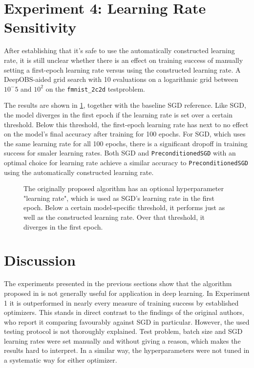 \documentclass[twoside,12pt,a4paper]{report}
\begin{document}
\section{Experiment 4: Learning Rate Sensitivity}

After establishing that it's safe to use the automatically constructed learning rate, it is still unclear whether there is an effect on training success of manually setting a first-epoch learning rate versus using the constructed learning rate.
A DeepOBS-aided grid search with 10 evaluations on a logarithmic grid between $10^-5$ and $10^2$ on the \verb|fmnist_2c2d| testproblem.

The results are shown in \ref{fig:exp_lr_sens}, together with the baseline SGD reference.
Like SGD, the model diverges in the first epoch if the learning rate is set over a certain threshold. Below this threshold, the first-epoch learning rate has next to no effect on the model's final accuracy after training for 100 epochs. For SGD, which uses the same learning rate for all 100 epochs, there is a significant dropoff in training success for smaler learning rates.
Both SGD and \verb|PreconditionedSGD| with an optimal choice for learning rate achieve a similar accuracy to \verb|PreconditionedSGD| using the automatically constructed learning rate. 

\begin{figure}
	\centering \hspace{-1,5cm}
	
	\caption{The originally proposed algorithm has an optional hyperparameter "learning rate", which is used as SGD's learning rate in the first epoch. Below a certain model-specific threshold, it performs just as well as the constructed learning rate. Over that threshold, it diverges in the first epoch. }
	\label{fig:exp_lr_sens}
\end{figure}



\section{Discussion}
The experiments presented in the previous sections show that the algorithm proposed in \cite{roos2019active} is not generally useful for application in deep learning. In Experiment 1 it is outperformed in nearly every measure of training success by established optimizers. This stands in direct contrast to the findings of the original authors, who report it comparing favourably against SGD in particular. However, the used testing protocol is not thoroughly explained. Test problem, batch size and SGD learning rates were set manually and without giving a reason, which makes the results hard to interpret. In a similar way, the hyperparameters were not tuned in a systematic way for either optimizer.
\end{document}
